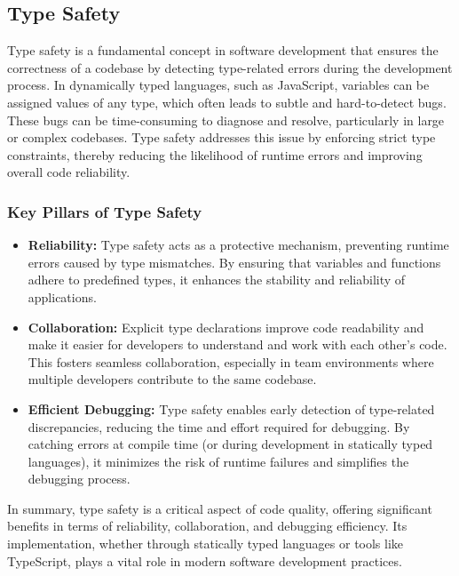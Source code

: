 \subsection{Type Safety}
\label{subsec:type-safety}

Type safety is a fundamental concept in software development that ensures the correctness of a codebase by detecting type-related errors during the development process. In dynamically typed languages, such as JavaScript, variables can be assigned values of any type, which often leads to subtle and hard-to-detect bugs. These bugs can be time-consuming to diagnose and resolve, particularly in large or complex codebases. Type safety addresses this issue by enforcing strict type constraints, thereby reducing the likelihood of runtime errors and improving overall code reliability. \cite{dev:type-safety}

\subsubsection*{Key Pillars of Type Safety}
\label{subsubsec:type-safety-pillars}

\begin{itemize}
    \item \textbf{Reliability:} Type safety acts as a protective mechanism, preventing runtime errors caused by type mismatches. By ensuring that variables and functions adhere to predefined types, it enhances the stability and reliability of applications. \cite{dev:type-safety}

    \item \textbf{Collaboration:} Explicit type declarations improve code readability and make it easier for developers to understand and work with each other's code. This fosters seamless collaboration, especially in team environments where multiple developers contribute to the same codebase. \cite{dev:type-safety}

    \item \textbf{Efficient Debugging:} Type safety enables early detection of type-related discrepancies, reducing the time and effort required for debugging. By catching errors at compile time (or during development in statically typed languages), it minimizes the risk of runtime failures and simplifies the debugging process. \cite{dev:type-safety}
\end{itemize}

In summary, type safety is a critical aspect of code quality, offering significant benefits in terms of reliability, collaboration, and debugging efficiency. Its implementation, whether through statically typed languages or tools like TypeScript, plays a vital role in modern software development practices. \cite{dev:type-safety}
